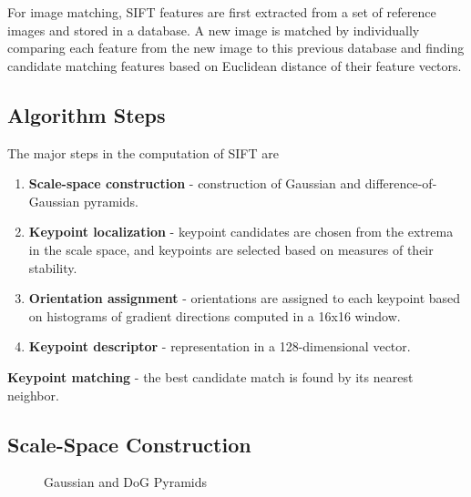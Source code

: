 \documentclass{article}
\begin{document}
For image matching, SIFT features are first extracted from a set of reference images and stored in a database. A new image is matched by individually comparing each feature from the new image to this previous database and finding candidate matching features based on Euclidean distance of their feature vectors. 

\subsection{Algorithm Steps}

The major steps in the computation of SIFT are \cite{dLowe04}

\begin{enumerate}
\item \textbf{Scale-space construction} - construction of Gaussian and difference-of-Gaussian pyramids. 
\item \textbf{Keypoint localization} - keypoint candidates are chosen from the extrema in the scale space, and keypoints are selected based on measures of their stability. 
\item \textbf{Orientation assignment} - orientations are assigned to each keypoint based on histograms of gradient directions computed in a 16x16 window. 
\item \textbf{Keypoint descriptor} - representation in a 128-dimensional vector.
\end{enumerate}

\noindent\textbf{Keypoint matching} - the best candidate match is found by its nearest neighbor.

\subsection{Scale-Space Construction}\label{SS:DSSE}

\begin{figure}[ht]
  \begin{center}
  \end{center}
  \caption{Gaussian and DoG Pyramids}
  \label{Fi:DOG}
\end{figure}
\end{document}
